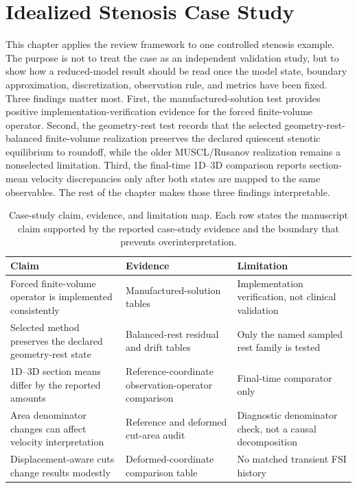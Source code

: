 \section{Idealized Stenosis Case Study}
\label{sec:case-study}
\label{sec:idealized-stenosis-case-study}

This chapter applies the review framework to one controlled stenosis example.
The purpose is not to treat the case as an independent validation study, but to
show how a reduced-model result should be read once the model state, boundary
approximation, discretization, observation rule, and metrics have been fixed.
Three findings matter most. First, the manufactured-solution test provides
positive implementation-verification evidence for the forced finite-volume
operator. Second, the geometry-rest test records that the selected
geometry-rest-balanced finite-volume realization preserves the declared
quiescent stenotic equilibrium to roundoff, while the older MUSCL/Rusanov
realization remains a nonselected limitation. Third, the final-time 1D--3D
comparison reports section-mean velocity discrepancies only after both states
are mapped to the same observables. The rest of the chapter makes those three
findings interpretable.

\begin{table}[!htb]
    \centering
    \scriptsize
    \caption{Case-study claim, evidence, and limitation map. Each row states
    the manuscript claim supported by the reported case-study evidence and the
    boundary that prevents overinterpretation.}
    \label{tab:case-study-claim-evidence-limitation}
    \begin{tabularx}{\textwidth}{@{}
        >{\raggedright\arraybackslash}p{}
        >{\raggedright\arraybackslash}p{}
        >{\raggedright\arraybackslash}X@{}}
        \toprule
        \textbf{Claim} & \textbf{Evidence} & \textbf{Limitation} \\
        \midrule
        Forced finite-volume operator is implemented consistently
            & Manufactured-solution tables
            & Implementation verification, not clinical validation \\
        Selected method preserves the declared geometry-rest state
            & Balanced-rest residual and drift tables
            & Only the named sampled rest family is tested \\
        1D--3D section means differ by the reported amounts
            & Reference-coordinate observation-operator comparison
            & Final-time comparator only \\
        Area denominator changes can affect velocity interpretation
            & Reference and deformed cut-area audit
            & Diagnostic denominator check, not a causal decomposition \\
        Displacement-aware cuts change results modestly
            & Deformed-coordinate comparison table
            & No matched transient FSI history \\
        \bottomrule
    \end{tabularx}
\end{table}

